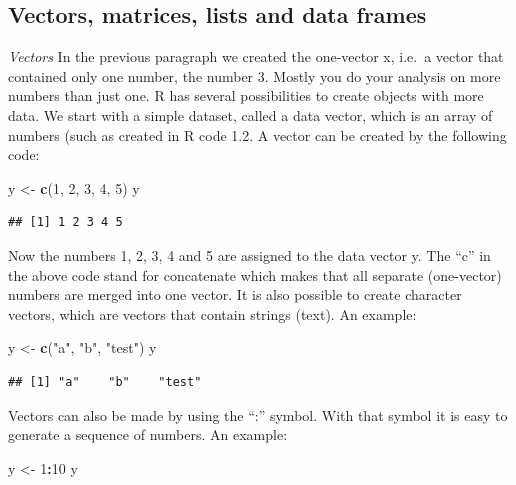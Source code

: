 \documentclass[]{book}
\newenvironment{Shaded}{\begin{snugshade}}{\end{snugshade}}
\newcommand{\KeywordTok}[1]{\textcolor[rgb]{0.13,0.29,0.53}{\textbf{#1}}}
\newcommand{\DecValTok}[1]{\textcolor[rgb]{0.00,0.00,0.81}{#1}}
\newcommand{\StringTok}[1]{\textcolor[rgb]{0.31,0.60,0.02}{#1}}
\newcommand{\OperatorTok}[1]{\textcolor[rgb]{0.81,0.36,0.00}{\textbf{#1}}}
\newcommand{\NormalTok}[1]{#1}
\theoremstyle{definition}
\theoremstyle{definition}
\theoremstyle{definition}
\theoremstyle{remark}
\begin{document}
\subsection{Vectors, matrices, lists and data
frames}\label{vectors-matrices-lists-and-data-frames}

\emph{Vectors} In the previous paragraph we created the one-vector x,
i.e.~a vector that contained only one number, the number 3. Mostly you
do your analysis on more numbers than just one. R has several
possibilities to create objects with more data. We start with a simple
dataset, called a data vector, which is an array of numbers (such as
created in R code 1.2. A vector can be created by the following code:

\begin{Shaded}
\begin{Highlighting}[]
\NormalTok{y <-}\StringTok{ }\KeywordTok{c}\NormalTok{(}\DecValTok{1}\NormalTok{, }\DecValTok{2}\NormalTok{, }\DecValTok{3}\NormalTok{, }\DecValTok{4}\NormalTok{, }\DecValTok{5}\NormalTok{)}
\NormalTok{y}
\end{Highlighting}
\end{Shaded}

\begin{verbatim}
## [1] 1 2 3 4 5
\end{verbatim}

Now the numbers 1, 2, 3, 4 and 5 are assigned to the data vector y. The
``c'' in the above code stand for concatenate which makes that all
separate (one-vector) numbers are merged into one vector. It is also
possible to create character vectors, which are vectors that contain
strings (text). An example:

\begin{Shaded}
\begin{Highlighting}[]
\NormalTok{y <-}\StringTok{ }\KeywordTok{c}\NormalTok{(}\StringTok{"a"}\NormalTok{, }\StringTok{"b"}\NormalTok{, }\StringTok{"test"}\NormalTok{)}
\NormalTok{y}
\end{Highlighting}
\end{Shaded}

\begin{verbatim}
## [1] "a"    "b"    "test"
\end{verbatim}

Vectors can also be made by using the ``:'' symbol. With that symbol it
is easy to generate a sequence of numbers. An example:

\begin{Shaded}
\begin{Highlighting}[]
\NormalTok{y <-}\StringTok{ }\DecValTok{1}\OperatorTok{:}\DecValTok{10}
\NormalTok{y}
\end{Highlighting}
\end{Shaded}
\end{document}
